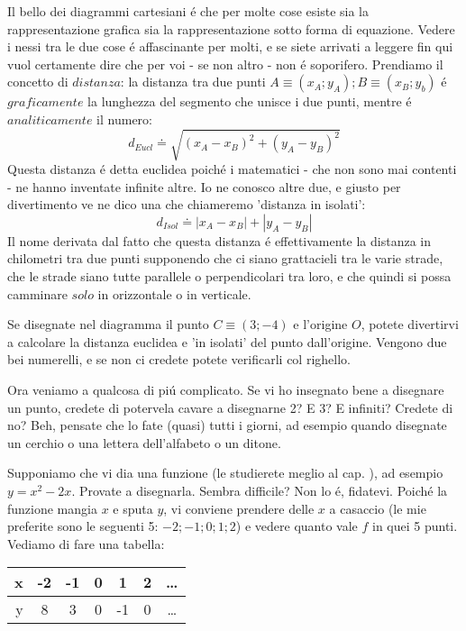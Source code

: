 Il bello dei diagrammi cartesiani \'e che per molte cose esiste sia la rappresentazione grafica sia la rappresentazione sotto forma di equazione. Vedere i nessi tra le due cose \'e affascinante per molti, e se siete arrivati a leggere fin qui vuol certamente dire che per voi - se non altro - non \'e soporifero. Prendiamo il concetto di $distanza$: la distanza tra due punti $A\equiv(x_A;y_A);B\equiv(x_B;y_b)$ \'e $graficamente$ la lunghezza del segmento che unisce i due punti, mentre \'e $analiticamente$ il numero: 
\label{distanza euclidea}
\begin{equation}
d_{Eucl} \doteq \sqrt{(x_A-x_B)^2+(y_A-y_B)^2}
\end{equation}
Questa distanza \'e detta euclidea poich\'e i matematici - che non sono mai contenti - ne hanno inventate infinite altre. Io ne conosco altre due, e giusto per divertimento ve ne dico una che chiameremo 'distanza in isolati':
\begin{equation}
d_{Isol} \doteq |x_A-x_B|+|y_A-y_B|
\end{equation}
Il nome derivata dal fatto che questa distanza \'e effettivamente la distanza in chilometri tra due punti supponendo che ci siano grattacieli tra le varie strade, che le strade siano tutte parallele o perpendicolari tra loro,  e che quindi si possa camminare $solo$ in orizzontale o in verticale.

Se disegnate nel diagramma il punto $C\equiv(3;-4)$ e l'origine $O$, potete divertirvi a calcolare la distanza euclidea e 'in isolati' del punto dall'origine. Vengono due bei numerelli, e se non ci credete potete verificarli col righello.

Ora veniamo a qualcosa di pi\'u complicato. Se vi ho insegnato bene a disegnare un punto, credete di potervela cavare a disegnarne 2? E 3? E infiniti?
Credete di no? Beh, pensate che lo fate (quasi) tutti i giorni, ad esempio quando disegnate un cerchio o una lettera dell'alfabeto o un ditone.

Supponiamo che vi dia una funzione (le studierete meglio al cap. ), ad esempio $y=x^2-2x$. Provate a disegnarla. Sembra difficile?
Non lo \'e, fidatevi. Poich\'e la funzione mangia $x$ e sputa $y$, vi conviene prendere delle $x$ a casaccio (le mie preferite sono le seguenti 5:
$-2;-1;0;1;2$) e vedere quanto vale $f$ in quei 5 punti. Vediamo di fare una tabella:

\begin{tabular}{|r||c|c|c|c|c|c|}
\hline
x & -2 & -1 &  0 & 1  &  2  & \ldots \\
\hline
y &  8 & 3  &  0 & -1  & 0  & \ldots \\
\hline
\end{tabular}

